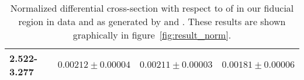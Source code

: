 \begin{table}
\begin{center}
\begin{tabular}{@{}l r r r@{}}
            2.522-3.277  &  $0.00212  \pm  0.00004$  &  $0.00211  \pm  0.00003$  &  $0.00181  \pm  0.00006$  \\
            \bottomrule
        \end{tabular}
    \end{center}
    \caption[
        Normalized differential cross-section with respect to \phistar of
        \Ztoee.
    ]{
        Normalized differential cross-section with respect to \phistar of
        \Ztoee in our fiducial region in data and as generated by \MADGRAPH and
        \POWHEG. These results are shown graphically in
        figure~\ref{fig:result_norm}.
    }
    \label{tab:results_norm}
\end{table}
